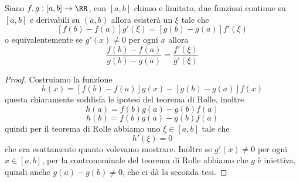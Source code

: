 \documentclass[11pt]{scrartcl}
\begin{document}
	\begin{theorem}[Cauchy]
		Siano $f,g:[a,b]\to\RR$, con $[a,b]$ chiuso e limitato, due funzioni continue su $[a,b]$ e derivabili su $(a,b)$ allora esisterà un $\xi$ tale che
		$$\left[f(b)-f(a)\right]g'(\xi)=\left[g(b)-g(a)\right]f'(\xi)$$
		o equivalentemente se $g'(x)\ne 0$ per ogni $x$ allora
		$$\frac{f(b)-f(a)}{g(b)-g(a)}=\frac{f'(\xi)}{g'(\xi)}$$
	\end{theorem}
	\begin{proof}
		Costruiamo la funzione
		$$h(x)=\left[f(b)-f(a)\right]g(x)-[g(b)-g(a)]f(x)$$
		questa chiaramente soddisfa le ipotesi del teorema di Rolle, inoltre 
		$$h(a)=f(b)g(a)-g(b)f(a)$$
		$$h(b)=f(b)g(a)-g(b)f(a)$$
		quindi per il teorema di Rolle abbiamo uno $\xi\in[a,b]$ tale che
		$$h'(\xi)=0$$
		che era esattamente quanto volevamo mostrare. Inoltre se $g'(x)\ne 0$ per ogni $x\in[a,b]$, per la contronominale del teorema di Rolle abbiamo che $g$ è iniettiva, quindi anche $g(a)-g(b)\ne 0$, che ci dà la seconda tesi.
	\end{proof}
\end{document}
